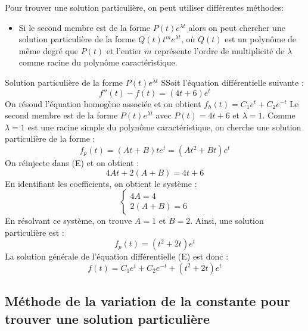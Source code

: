 \documentclass[a4paper,11pt]{article}
\begin{document}
            Pour trouver une solution particulière, on peut utiliser différentes méthodes:
            \begin{itemize}
                \item Si le second membre est de la forme $P(t)e^{\lambda t}$ alors on peut chercher une solution particulière de la forme $Q(t)t^m e^{\lambda t}$, où $Q(t)$ est un polynôme de même degré que $P(t)$ et l'entier $m$ représente l'ordre de multiplicité de $\lambda$ comme racine du polynôme caractéristique.
            \end{itemize}

            \begin{exemple}{Solution particulière de la forme $P(t)e^{\lambda t}$}
                SSoit l'équation différentielle suivante :
                \begin{equation}
                    \tag{E}
                    f''(t) - f(t) = (4t+6)e^t
                \end{equation}
                On  résoud l'équation homogène associée et on obtient $f_h(t) = C_1 e^t + C_2 e^{-t}$
                Le second membre est de la forme $P(t)e^{\lambda t}$ avec $P(t) = 4t + 6$ et $\lambda = 1$. Comme $\lambda = 1$ est une racine simple du polynôme caractéristique, on cherche une solution particulière de la forme :
                    $$ f_p(t) = (At + B)te^t = (At^2 + Bt)e^t $$
                On réinjecte dans (E) et on obtient :
                    $$ 4At + 2(A+B) = 4t + 6 $$
                En identifiant les coefficients, on obtient le système :
                \begin{equation*}
                    \begin{cases}
                        4A = 4 \\
                        2(A+B) = 6
                    \end{cases}
                \end{equation*}
                En résolvant ce système, on trouve $A = 1$ et $B = 2$.
                Ainsi, une solution particulière est :
                    $$ f_p(t) = (t^2 + 2t)e^t $$
                La solution générale de l'équation différentielle (E) est donc :
                    $$ f(t) = C_1 e^t + C_2 e^{-t} + (t^2 + 2t)e^t $$
            \end{exemple}

        \subsection*{Méthode de la variation de la constante pour trouver une solution particulière}
            
\end{document}
